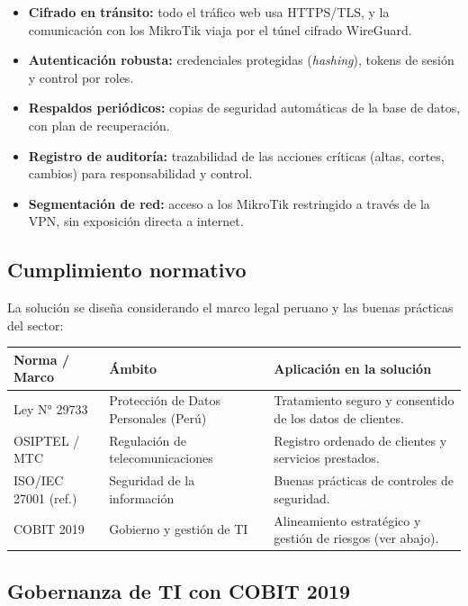 \begin{itemize}[leftmargin=1.4em]
  \item \textbf{Cifrado en tránsito:} todo el tráfico web usa HTTPS/TLS, y la
  comunicación con los MikroTik viaja por el túnel cifrado WireGuard.
  \item \textbf{Autenticación robusta:} credenciales protegidas (\textit{hashing}),
  tokens de sesión y control por roles.
  \item \textbf{Respaldos periódicos:} copias de seguridad automáticas de la base de
  datos, con plan de recuperación.
  \item \textbf{Registro de auditoría:} trazabilidad de las acciones críticas (altas,
  cortes, cambios) para responsabilidad y control.
  \item \textbf{Segmentación de red:} acceso a los MikroTik restringido a través de la
  VPN, sin exposición directa a internet.
\end{itemize}

\subsection{Cumplimiento normativo}

La solución se diseña considerando el marco legal peruano y las buenas prácticas del
sector:

\begin{center}
\label{tab:normativo}
\begin{tabularx}{\textwidth}{L{3cm} L{3.4cm} X}
\toprule
\textbf{Norma / Marco} & \textbf{Ámbito} & \textbf{Aplicación en la solución} \\
\midrule
Ley N° 29733 & Protección de Datos Personales (Perú) &
Tratamiento seguro y consentido de los datos de clientes. \\
OSIPTEL / MTC & Regulación de telecomunicaciones &
Registro ordenado de clientes y servicios prestados. \\
ISO/IEC 27001 (ref.) & Seguridad de la información &
Buenas prácticas de controles de seguridad. \\
COBIT 2019 & Gobierno y gestión de TI &
Alineamiento estratégico y gestión de riesgos (ver abajo). \\
\bottomrule
\end{tabularx}
\end{center}

\subsection{Gobernanza de TI con COBIT 2019}

